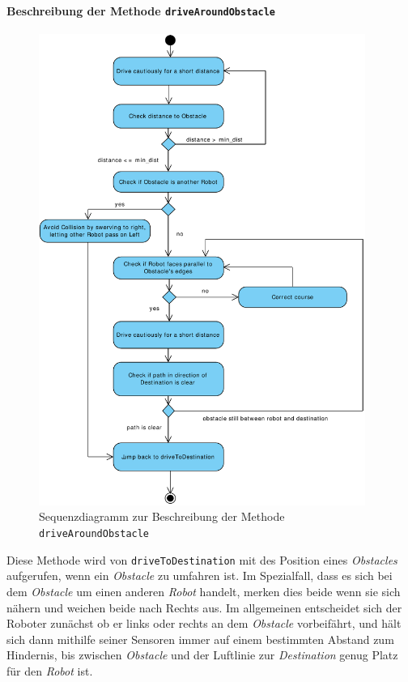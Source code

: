			\paragraph{Beschreibung der Methode \texttt{driveAroundObstacle}}
			\begin{figure}[H]
			\centering
			\includegraphics[width=0.95\textwidth]{img/1-Entwurf-7-driveAroundObstacle}
			\caption{Sequenzdiagramm zur Beschreibung der Methode \texttt{driveAroundObstacle}}
			\label{SequenzDriveAroundObstacle}
			\end{figure}

			Diese Methode wird von \texttt{driveToDestination} mit des Position eines \textit{Obstacles} aufgerufen, 
			wenn ein \textit{Obstacle} zu umfahren ist. 
			Im Spezialfall, dass es sich bei dem \textit{Obstacle} um einen anderen \textit{Robot} handelt, merken dies beide wenn sie sich nähern und weichen beide nach Rechts aus. Im allgemeinen entscheidet sich der Roboter zunächst ob er links oder rechts an dem \textit{Obstacle} vorbeifährt, 
			und hält sich dann mithilfe seiner Sensoren immer auf einem bestimmten Abstand zum Hindernis, bis zwischen 
			\textit{Obstacle} und der Luftlinie zur \textit{Destination} genug Platz für den \textit{Robot} ist.
			
